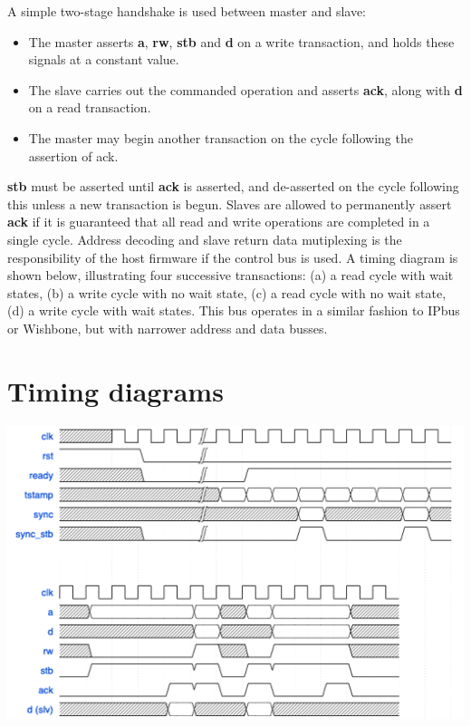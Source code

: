 \documentclass{article}
\begin{document}
A simple two-stage handshake is used between master and slave:

\begin{itemize}
\item The master asserts \textbf{a}, \textbf{rw}, \textbf{stb} and \textbf{d} on a write transaction, and holds these signals at a constant value.
\item The slave carries out the commanded operation and asserts \textbf{ack}, along with \textbf{d} on a read transaction.
\item The master may begin another transaction on the cycle following the assertion of ack.
\end{itemize}

\textbf{stb} must be asserted until \textbf{ack} is asserted, and de-asserted on the cycle following this unless a new transaction is begun. Slaves are allowed to permanently assert \textbf{ack} if it is guaranteed that all read and write operations are completed in a single cycle. Address decoding and slave return data mutiplexing is the responsibility of the host firmware if the control bus is used. A timing diagram is shown below, illustrating four successive transactions: (a) a read cycle with wait states, (b) a write cycle with no wait state, (c) a read cycle with no wait state, (d) a write cycle with wait states. This bus operates in a similar fashion to IPbus or Wishbone, but with narrower address and data busses.


\section{Timing diagrams}

\includegraphics[width=1\textwidth]{dts_endpoint_timing_diagram.png}
\end{document}
